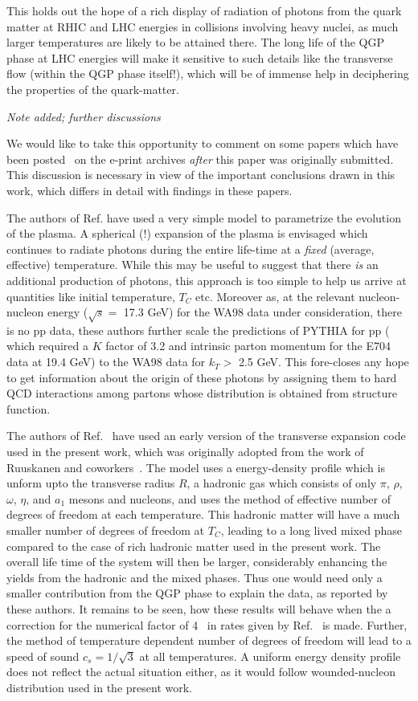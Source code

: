 This holds out the hope of a rich display of radiation of
photons from the quark matter at
RHIC and LHC energies in collisions involving heavy nuclei, as  much
larger temperatures are likely to be attained there. The long life of the
QGP phase at LHC energies will make it sensitive to such details like
the transverse flow (within the QGP phase itself!), which will be of immense
help in deciphering the properties of the quark-matter. 

{\em {Note added; further discussions}}

  We would like to take this opportunity to 
comment on some papers which have been posted~\cite{kam,jane,rus}
on the e-print archives {\em after} this paper was originally submitted.
This discussion is necessary in view of the important conclusions drawn
in this work, which differs in detail with findings in these papers.

The authors of Ref.\cite{kam} have used a very simple model to 
parametrize the evolution of the plasma. A spherical (!) expansion of the
plasma is envisaged which continues to radiate photons during the 
entire life-time at a {\em fixed} (average, effective) temperature. 
While this may be useful to suggest that there {\it is}  an additional
production of photons, this  approach is too simple to help us
arrive at quantities like initial temperature, $T_C$ etc.
Moreover as, at the relevant nucleon-nucleon energy 
($\sqrt{s}=$ 17.3 GeV) for the WA98 data under consideration, there is 
no pp data, these authors further scale the predictions of PYTHIA for
pp ( which required a $K$ factor of 3.2 and intrinsic parton momentum
for the E704  data at 19.4 GeV)
 to the WA98 data for $k_T >$ 2.5 GeV. This fore-closes any 
hope to get information about the origin of these photons by assigning them
to hard QCD interactions among partons whose distribution is obtained 
from structure function.

The authors of Ref.~\cite{jane} have used an early version of the
transverse expansion code used in the present work, which was 
originally adopted from the work of Ruuskanen and coworkers~\cite{hydro}. The
model uses a energy-density profile which is unform upto the
transverse radius $R$,  a hadronic gas which consists of only $\pi$,
$\rho$, $\omega$, $\eta$, and $a_1$ mesons and nucleons,
and uses the method of effective number of degrees of freedom 
at each temperature. This hadronic matter will have a much smaller
number of degrees of freedom at $T_C$, leading to a long lived mixed
phase compared to the case of rich hadronic matter used in the 
present work. The overall life time of the system will then be larger,
considerably enhancing the yields from the hadronic and the mixed phases.
Thus one would need only a smaller contribution from the QGP phase
to explain the data, as reported by these authors. It remains to be
seen, how these results will behave when the a correction for the
numerical factor of 4~\cite{MT} in rates given by Ref.~\cite{pat}
is made.
Further, the method of temperature dependent  number of degrees of freedom
will lead to a speed of sound $c_s=1/\sqrt{3}$ at all temperatures. A
uniform energy density profile does not reflect the actual situation either,
as it would follow wounded-nucleon distribution used in the present
work.  

